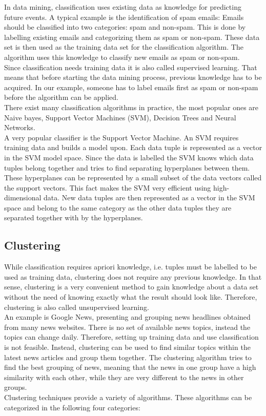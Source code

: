 In data mining, classification uses existing data as knowledge for predicting future events. A typical example is the identification of spam emails: Emails should be classified into two categories: spam and non-spam. This is done by labelling existing emails and categorizing them as spam or non-spam. These data set is then used as the training data set for the classification algorithm. The algorithm uses this knowledge to classify new emails as spam or non-spam.
\\
Since classification needs training data it is also called supervised learning. That means that before starting the data mining process, previous knowledge has to be acquired. In our example, someone has to label emails first as spam or non-spam before the algorithm can be applied. 
\\
There exist many classification algorithms in practice, the most popular ones are Naive bayes, Support Vector Machines (SVM), Decision Trees and Neural Networks.
\\
A very popular classifier is the Support Vector Machine. An SVM requires training data and builds a model upon. Each data tuple is represented as a vector in the SVM model space. Since the data is labelled the SVM knows which data tuples belong together and tries to find separating hyperplanes between them. These hyperplanes can be represented by a small subset of the data vectors called the support vectors. This fact makes the SVM very efficient using high-dimensional data. New data tuples are then represented as a vector in the SVM space and belong to the same category as the other data tuples they are separated together with by the hyperplanes.

\subsection{Clustering}

While classification requires apriori knowledge, i.e. tuples must be labelled to be used as training data, clustering does not require any previous knowledge. In that sense, clustering is a very convenient method to gain knowledge about a data set without the need of knowing exactly what the result should look like. Therefore, clustering is also called unsupervised learning.
\\
An example is Google News, presenting and grouping news headlines obtained from many news websites. There is no set of available news topics, instead the topics can change daily. Therefore, setting up training data and use classification is not feasible. Instead, clustering can be used to find similar topics within the latest news articles and group them together. The clustering algorithm tries to find the best grouping of news, meaning that the news in one group have a high similarity with each other, while they are very different to the news in other groups. 
\\
Clustering techniques provide a variety of algorithms. These algorithms can be categorized in the following four categories:

